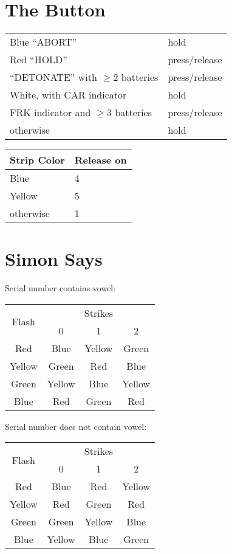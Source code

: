 \documentclass[11pt]{amsart}
\begin{document}
\section{The Button}

\begin{tabular}{|l|l|}
\hline
Blue ``ABORT''                      & hold          \\
Red ``HOLD''                        & press/release \\
``DETONATE'' with $\ge 2$ batteries & press/release \\
White, with CAR indicator           & hold          \\
FRK indicator and $\ge 3$ batteries & press/release \\
otherwise                           & hold          \\
\hline
\end{tabular}

\begin{tabular}{|l|l|}
\hline
Strip Color & Release on \\
\hline
Blue        & 4 \\
Yellow      & 5 \\
otherwise   & 1 \\
\hline
\end{tabular}



\section{Simon Says}

Serial number contains vowel:

\begin{tabular}{|c|c|c|c|}
\hline
\multirow{2}{*}{Flash} & \multicolumn{3}{|c|}{Strikes} \\
\cline{2-4}
 & 0 & 1 & 2 \\
\hline
Red & Blue & Yellow & Green \\
Yellow & Green & Red & Blue \\
Green & Yellow & Blue & Yellow \\
Blue & Red & Green & Red \\
\hline
\end{tabular}

Serial number does not contain vowel:

\begin{tabular}{|c|c|c|c|}
\hline
\multirow{2}{*}{Flash} & \multicolumn{3}{|c|}{Strikes} \\
\cline{2-4}
 & 0 & 1 & 2 \\
\hline
Red & Blue & Red & Yellow \\
Yellow & Red & Green & Red \\
Green & Green & Yellow & Blue \\
Blue & Yellow & Blue & Green \\
\hline
\end{tabular}
\end{document}
